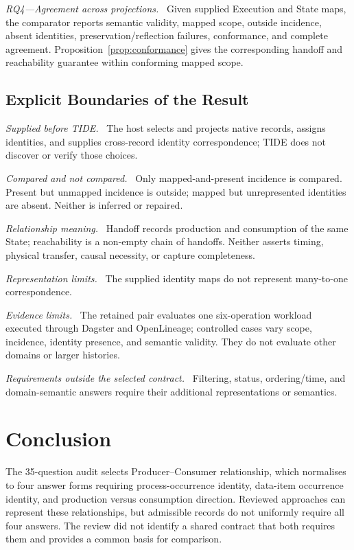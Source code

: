 \documentclass[conference]{IEEEtran}
\theoremstyle{tideproposition}
\newcommand{\reviewitem}[1]{\par\addvspace{0.22\baselineskip}\noindent\emph{#1.}\ }
\begin{document}
\reviewitem{RQ4---Agreement across projections}
Given supplied Execution and State maps, the comparator reports semantic validity, mapped scope, outside incidence, absent identities, preservation/reflection failures, conformance, and complete agreement. Proposition~\ref{prop:conformance} gives the corresponding handoff and reachability guarantee within conforming mapped scope.

\subsection{Explicit Boundaries of the Result}

\reviewitem{Supplied before TIDE}
The host selects and projects native records, assigns identities,
and supplies cross-record identity correspondence; TIDE does not discover or verify those choices.

\reviewitem{Compared and not compared}
Only mapped-and-present incidence is compared. Present but unmapped incidence
is outside; mapped but unrepresented identities are absent. Neither is inferred
or repaired.

\reviewitem{Relationship meaning}
Handoff records production and consumption of the same State; reachability is a non-empty chain of handoffs. Neither asserts timing, physical transfer, causal necessity, or capture completeness.

\reviewitem{Representation limits}
The supplied identity maps do not represent many-to-one correspondence.

\reviewitem{Evidence limits}
The retained pair evaluates one six-operation workload executed through Dagster and OpenLineage; controlled cases vary scope, incidence, identity presence, and semantic validity. They do not evaluate other domains or larger histories.

\reviewitem{Requirements outside the selected contract}
Filtering, status, ordering/time, and domain-semantic answers require their
additional representations or semantics.

\section{Conclusion}
The 35-question audit selects Producer--Consumer relationship, which normalises to four answer forms requiring process-occurrence identity, data-item occurrence identity, and production versus consumption direction. Reviewed approaches can represent these relationships, but admissible records do not uniformly require all four answers. The review did not identify a shared contract that both requires them and provides a common basis for comparison.
\end{document}
